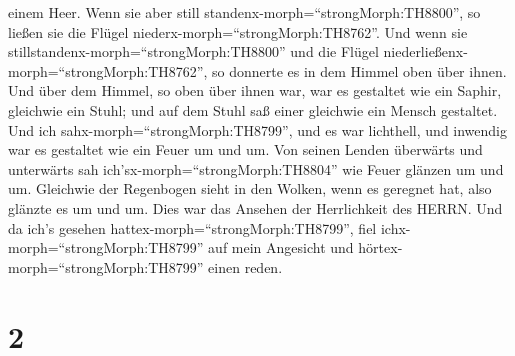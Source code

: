 einem Heer. Wenn sie aber still standenx-morph=``strongMorph:TH8800'',
so ließen sie die Flügel niederx-morph=``strongMorph:TH8762''.
 Und wenn sie stillstandenx-morph=``strongMorph:TH8800''
und die Flügel niederließenx-morph=``strongMorph:TH8762'', so donnerte
es in dem Himmel oben über ihnen.  Und über dem Himmel, so
oben über ihnen war, war es gestaltet wie ein Saphir, gleichwie ein
Stuhl; und auf dem Stuhl saß einer gleichwie ein Mensch gestaltet.
 Und ich sahx-morph=``strongMorph:TH8799'', und es war
lichthell, und inwendig war es gestaltet wie ein Feuer um und um. Von
seinen Lenden überwärts und unterwärts sah
ich'sx-morph=``strongMorph:TH8804'' wie Feuer glänzen um und um.
 Gleichwie der Regenbogen sieht in den Wolken, wenn es
geregnet hat, also glänzte es um und um. Dies war das Ansehen der
Herrlichkeit des HERRN. Und da ich's gesehen
hattex-morph=``strongMorph:TH8799'', fiel
ichx-morph=``strongMorph:TH8799'' auf mein Angesicht und
hörtex-morph=``strongMorph:TH8799'' einen reden.

\hypertarget{section-1}{%
\section{2}\label{section-1}}

